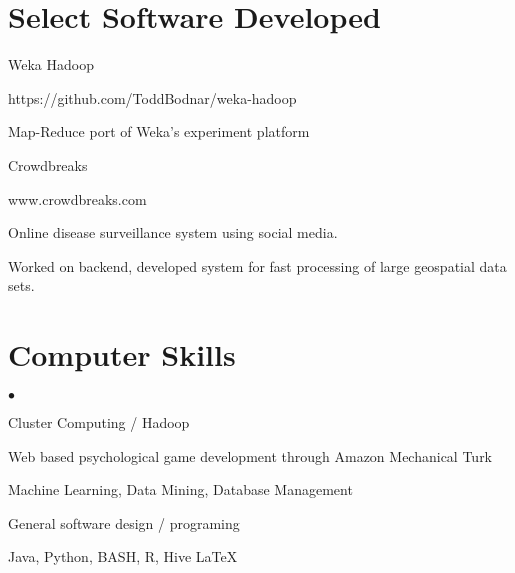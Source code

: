 \documentclass[margin,line]{res}
\newcommand{\linkToUrl}[1]{{\color{blue}\underline{\href{#1}{Link}}}}
\newenvironment{list1}{
  \begin{list}{\ding{113}}{%
      \setlength{\itemsep}{0in}
      \setlength{\parsep}{0in} \setlength{\parskip}{0in}
      \setlength{\topsep}{0in} \setlength{\partopsep}{0in} 
      \setlength{\leftmargin}{0.17in}}}{\end{list}}
\newenvironment{list2}{
  \begin{list}{$\bullet$}{%
      \setlength{\itemsep}{0in}
      \setlength{\parsep}{0in} \setlength{\parskip}{0in}
      \setlength{\topsep}{0in} \setlength{\partopsep}{0in} 
      \setlength{\leftmargin}{10pt}}}{\end{list}}
\begin{document}
\begin{resume}



\section{\sc Select Software Developed}
Weka Hadoop
\begin{list1}
\item[] https://github.com/ToddBodnar/weka-hadoop
\item[] Map-Reduce port of Weka's experiment platform
\end{list1}

Crowdbreaks%
\begin{list1}
\item[] www.crowdbreaks.com
\item[] Online disease surveillance system using social media.
\item[] Worked on backend, developed system for fast processing of large geospatial data sets.
\end{list1}



\section{\sc Computer Skills} 
\begin{list2}
\item Cluster Computing / Hadoop 
\item Web based psychological game development through Amazon Mechanical Turk
\item Machine Learning, Data Mining, Database Management
\item General software design / programing
\item Java, Python, BASH, R, Hive \LaTeX
\end{list2}


\end{resume}
\end{document}
